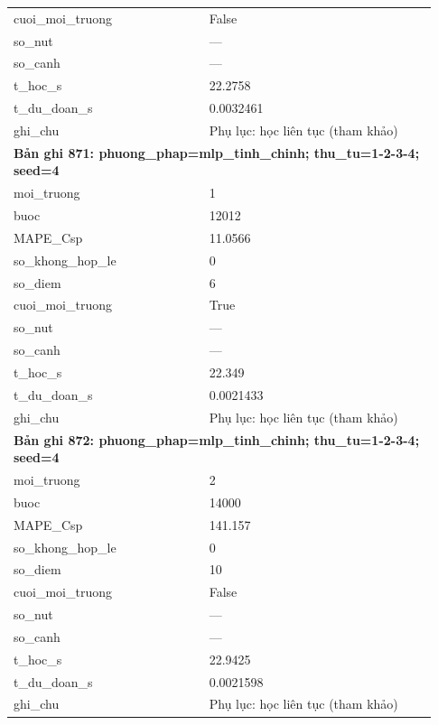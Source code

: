 \begin{longtable}{p{0.43\linewidth}p{0.50\linewidth}}
cuoi\_\allowbreak moi\_\allowbreak truong & False \\
so\_\allowbreak nut & — \\
so\_\allowbreak canh & — \\
t\_\allowbreak hoc\_\allowbreak s & 22.2758 \\
t\_\allowbreak du\_\allowbreak doan\_\allowbreak s & 0.0032461 \\
ghi\_\allowbreak chu & Phụ lục: học liên tục (tham khảo) \\
\midrule
\multicolumn{2}{p{0.95\linewidth}}{\textbf{Bản ghi 871: phuong\_phap=mlp\_tinh\_chinh; thu\_tu=1-2-3-4; seed=4}} \\
moi\_\allowbreak truong & 1 \\
buoc & 12012 \\
MAPE\_\allowbreak Csp & 11.0566 \\
so\_\allowbreak khong\_\allowbreak hop\_\allowbreak le & 0 \\
so\_\allowbreak diem & 6 \\
cuoi\_\allowbreak moi\_\allowbreak truong & True \\
so\_\allowbreak nut & — \\
so\_\allowbreak canh & — \\
t\_\allowbreak hoc\_\allowbreak s & 22.349 \\
t\_\allowbreak du\_\allowbreak doan\_\allowbreak s & 0.0021433 \\
ghi\_\allowbreak chu & Phụ lục: học liên tục (tham khảo) \\
\midrule
\multicolumn{2}{p{0.95\linewidth}}{\textbf{Bản ghi 872: phuong\_phap=mlp\_tinh\_chinh; thu\_tu=1-2-3-4; seed=4}} \\
moi\_\allowbreak truong & 2 \\
buoc & 14000 \\
MAPE\_\allowbreak Csp & 141.157 \\
so\_\allowbreak khong\_\allowbreak hop\_\allowbreak le & 0 \\
so\_\allowbreak diem & 10 \\
cuoi\_\allowbreak moi\_\allowbreak truong & False \\
so\_\allowbreak nut & — \\
so\_\allowbreak canh & — \\
t\_\allowbreak hoc\_\allowbreak s & 22.9425 \\
t\_\allowbreak du\_\allowbreak doan\_\allowbreak s & 0.0021598 \\
ghi\_\allowbreak chu & Phụ lục: học liên tục (tham khảo) \\

\end{longtable}
